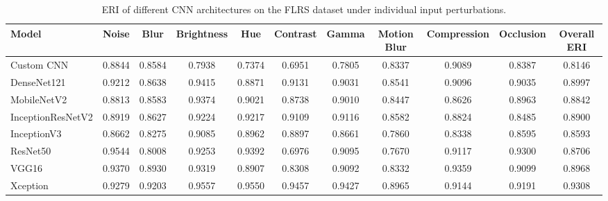 \documentclass[a4paper,fleqn]{cas-dc}
\begin{document}
\begin{table}[t]
\centering
\caption{ERI of different CNN architectures on the FLRS dataset under individual input perturbations.}
\label{tab:eri_perturbation_tf_flowers}

\scriptsize
\setlength{\tabcolsep}{4pt}
\renewcommand{\arraystretch}{1.1}

\begin{tabular}{|l|ccccccccc|c|}
\hline
\textbf{Model} &
\textbf{Noise} &
\textbf{Blur} &
\textbf{Brightness} &
\textbf{Hue} &
\textbf{Contrast} &
\textbf{Gamma} &
\textbf{Motion Blur} &
\textbf{Compression} &
\textbf{Occlusion} &
\textbf{Overall ERI} \\
\hline

Custom CNN
&0.8844&0.8584&0.7938&0.7374&0.6951&0.7805&0.8337&0.9089&0.8387&0.8146\\

DenseNet121
&0.9212&0.8638&0.9415&0.8871&0.9131&0.9031&0.8541&0.9096&0.9035&0.8997\\

MobileNetV2
&0.8813&0.8583&0.9374&0.9021&0.8738&0.9010&0.8447&0.8626&0.8963&0.8842\\

InceptionResNetV2
&0.8919&0.8627&0.9224&0.9217&0.9109&0.9116&0.8582&0.8824&0.8485&0.8900\\

InceptionV3
&0.8662&0.8275&0.9085&0.8962&0.8897&0.8661&0.7860&0.8338&0.8595&0.8593\\

ResNet50
&0.9544&0.8008&0.9253&0.9392&0.6976&0.9095&0.7670&0.9117&0.9300&0.8706\\

VGG16
&0.9370&0.8930&0.9319&0.8907&0.8308&0.9092&0.8332&0.9359&0.9099&0.8968\\

Xception
&0.9279&0.9203&0.9557&0.9550&0.9457&0.9427&0.8965&0.9144&0.9191&0.9308\\

\hline
\end{tabular}
\end{table}
\end{document}
